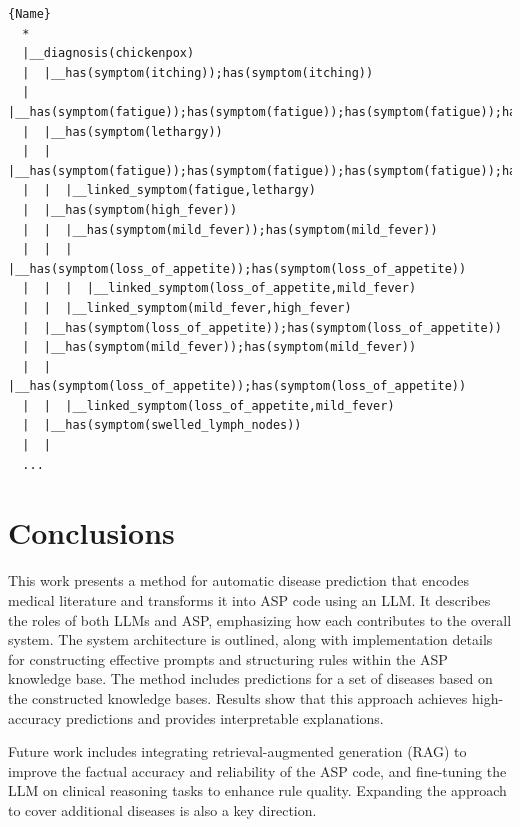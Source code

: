 \documentclass[10pt,leqno]{amsart}
\begin{document}
\begin{lstlisting}[caption={A part of the explanation for the chickenpox diagnosis. 
    The decision tree illustrates the symptom associations and outlines 
    the reasoning process used by the system to reach its conclusion.},
label=lst:terms]{Name}
  *
  |__diagnosis(chickenpox)
  |  |__has(symptom(itching));has(symptom(itching))
  |  |__has(symptom(fatigue));has(symptom(fatigue));has(symptom(fatigue));has(symptom(fatigue));has(symptom(fatigue))
  |  |__has(symptom(lethargy))
  |  |  |__has(symptom(fatigue));has(symptom(fatigue));has(symptom(fatigue));has(symptom(fatigue));has(symptom(fatigue))
  |  |  |__linked_symptom(fatigue,lethargy)
  |  |__has(symptom(high_fever))
  |  |  |__has(symptom(mild_fever));has(symptom(mild_fever))
  |  |  |  |__has(symptom(loss_of_appetite));has(symptom(loss_of_appetite))
  |  |  |  |__linked_symptom(loss_of_appetite,mild_fever)
  |  |  |__linked_symptom(mild_fever,high_fever)
  |  |__has(symptom(loss_of_appetite));has(symptom(loss_of_appetite))
  |  |__has(symptom(mild_fever));has(symptom(mild_fever))
  |  |  |__has(symptom(loss_of_appetite));has(symptom(loss_of_appetite))
  |  |  |__linked_symptom(loss_of_appetite,mild_fever)
  |  |__has(symptom(swelled_lymph_nodes))
  |  |  
  ...
\end{lstlisting}

\section{Conclusions}

This work presents a method for automatic disease prediction 
that encodes medical literature and transforms it into ASP code using an LLM. 
It describes the roles of both LLMs and ASP, emphasizing how each contributes to the overall system. 
The system architecture is outlined, along with implementation details for constructing effective prompts 
and structuring rules within the ASP knowledge base.
The method includes predictions for a set of diseases based on the constructed knowledge bases. 
Results show that this approach achieves high-accuracy predictions and provides interpretable explanations.

Future work includes integrating retrieval-augmented generation (RAG) to improve the factual accuracy 
and reliability of the ASP code, and fine-tuning the LLM on clinical reasoning tasks to enhance rule quality. 
Expanding the approach to cover additional diseases is also a key direction.
\newpage


\end{document}
